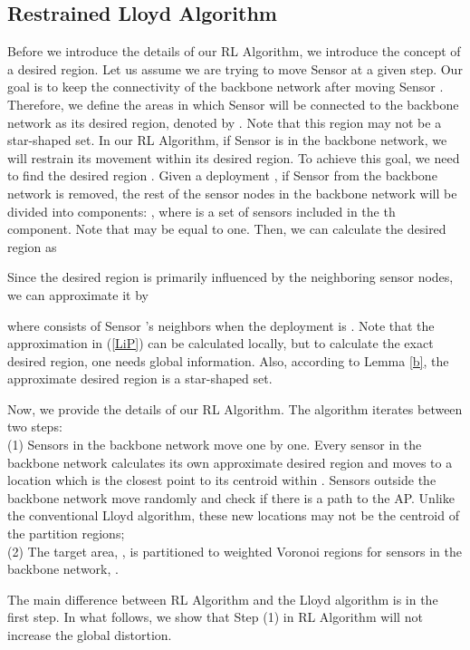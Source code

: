 \documentclass[journal,draftcls,onecolumn,12pt,twoside, narroweqnarray]{IEEEtran}
\begin{document}
\subsection{Restrained Lloyd Algorithm}
Before we introduce the details of our RL Algorithm, we introduce the concept of a desired region. Let us assume we are trying to move Sensor  at a given step.
Our goal is to keep the connectivity of the backbone network after moving Sensor . Therefore, we define the areas in which Sensor  will be connected to the backbone network as its desired region, denoted by . Note that this region may not be a star-shaped set. In our RL Algorithm, if Sensor  is in the backbone network, we will restrain its movement within its desired region. To achieve this goal, we need to find the desired region .
Given a deployment , if Sensor  from the backbone network is removed, the rest of the sensor nodes in the backbone network will be divided into  components: , where  is a set of sensors included in the th component. Note that  may be equal to one. Then, we can calculate the desired  region as

Since the desired region is primarily influenced by the neighboring sensor nodes, we can approximate it by

where  consists of Sensor 's neighbors when the deployment is . Note that the approximation in (\ref{LiP}) can be calculated locally, but to calculate the exact desired region, one needs global information. Also, according to Lemma \ref{b}, the approximate desired region  is a star-shaped set.

Now, we provide the details of our RL Algorithm. The algorithm iterates between two steps: \\
(1) Sensors in the backbone network move one by one. Every sensor in the backbone network calculates its own approximate desired region  and moves to a location which is the closest point to its centroid  within . Sensors outside the backbone network move randomly and check if there is a path to the AP. Unlike the conventional Lloyd algorithm, these new locations may not be the centroid of the partition regions;
\\
(2) The target area, , is partitioned to weighted Voronoi regions for sensors in the backbone network, .


The main difference between RL Algorithm and the Lloyd algorithm is in the first step.
In what follows, we show that Step (1) in RL Algorithm will not increase the global distortion.
\end{document}
